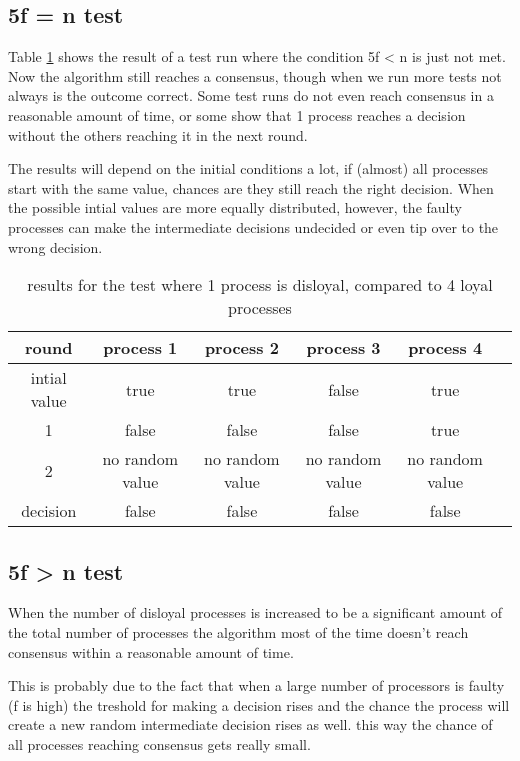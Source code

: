 \subsection{5f = n test}
Table \ref{table:resultsBoundaryDisloyal} shows the result of a test run where the condition 5f < n is just not met. 
Now the algorithm still reaches a consensus, though when we run more tests not always is the outcome correct.
Some test runs do not even reach consensus in a reasonable amount of time, or some show that 1 process reaches a decision without the others reaching it in the next round. 

The results will depend on the initial conditions a lot, if (almost) all processes start with the same value, chances are they still reach the right decision. When the possible intial values are more equally distributed, however, the faulty processes can make the intermediate decisions undecided or even tip over to the wrong decision.

\begin{table}[h]
	\begin{tabular}{ | c | c  | c  | c| c | c |}
		\hline
  		round & process 1 & process 2 & process 3 & process 4  \\
		\hline
 		intial value &  true & true & false & true\\
		\hline
		1  &  false & false & false  & true  \\
		\hline
		2  &  no random value &  no random value & no random value &  no random value \\
		\hline
  		decision  &  false & false & false  & false  \\
		\hline
	\end{tabular}
	\caption{results for the test where 1 process is disloyal, compared to 4 loyal processes}	
	\label{table:resultsBoundaryDisloyal}
\end{table}

\subsection{5f > n test}
 
When the number of disloyal processes is  increased to be a significant amount of the total number of processes the algorithm most of the time doesn't reach consensus within a reasonable amount of time. 

This is probably due to the fact that when a large number of processors is faulty (f is high) the treshold for making a decision rises and the chance the process will create a new random intermediate decision rises as well. this way the chance of all processes reaching consensus gets really small.

